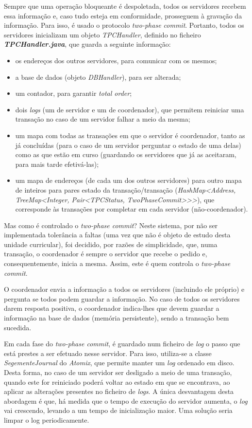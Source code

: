 \documentclass[a4paper]{report}
\begin{document}
		Sempre que uma operação bloqueante é despoletada, todos os servidores recebem essa informação e, caso tudo esteja em conformidade, prosseguem à gravação da informação.
		Para isso, é usado o protocolo \textit{two-phase commit}. Portanto, todos os servidores inicializam um objeto \textit{TPCHandler}, definido no ficheiro \textit{\textbf{TPCHandler.java}}, 
		que guarda a seguinte informação:
		\begin{itemize}
		\item os endereços dos outros servidores, para comunicar com os mesmos;
		\item a base de dados (objeto \textit{DBHandler}), para ser alterada;
		\item um contador, para garantir \textit{total order};
		\item dois \textit{logs} (um de servidor e um de coordenador), que permitem reiniciar uma transação no caso de um servidor falhar a meio da mesma;
		\item um mapa com todas as transações em que o servidor é coordenador, tanto as já concluídas (para o caso de um servidor perguntar o estado de uma delas) como as que estão em curso (guardando os servidores que já as aceitaram, para mais tarde efetivá-las);
		\item um mapa de endereços (de cada um dos outros servidores) para outro mapa de inteiros para pares estado da transação/transação 
		(\textit{HashMap<Address, TreeMap<Integer, Pair<TPCStatus, TwoPhaseCommit>>>}), que corresponde às transações por completar em cada servidor (não-coordenador).
		\end{itemize}
		
		Mas como é controlado o \textit{two-phase commit}?
		Neste sistema, por não ser implementada tolerância a faltas (uma vez que não é objeto de estudo desta unidade curricular), foi decidido, por razões de simplicidade, 
		que, numa transação, o coordenador é sempre o servidor que recebe o pedido e, consequentemente, inicia a mesma.
		Assim, este é quem controla o \textit{two-phase commit}.

		O coordenador envia a informação a todos os servidores (incluindo ele próprio) e pergunta se todos podem guardar a informação. 
		No caso de todos os servidores darem resposta positiva, o coordenador indica-lhes que devem guardar a informação na base de dados (memória persistente), sendo a transação bem sucedida.

		Em cada fase do \textit{two-phase commit}, é guardado num ficheiro de \textit{log} o passo que está prestes a ser efetuado nesse servidor. Para isso, utiliza-se a classe \textit{SegementeJournal} do \textit{Atomix}, que permite manter um \textit{log} ordenado em disco. Desta forma, no caso de um servidor ser desligado a meio de uma transação, quando este for reiniciado poderá voltar ao estado em que se encontrava, ao aplicar as alterações presentes no ficheiro de \textit{logs}. A única desvantagem desta abordagem é que, há medida que o tempo de execução do servidor aumenta, o \textit{log} vai crescendo, levando a um tempo de inicialização maior. Uma solução seria limpar o log periodicamente.
\end{document}
